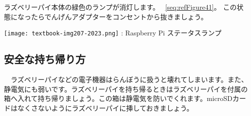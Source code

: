 \documentclass[a4paper,12pt]{jarticle}
\begin{document}
\bigskip
\flushleft
\textcolor[rgb]{0.13333334,0.13333334,0.13333334}{ラズベリーパイ本体の緑色のランプが消灯します。
  ~\ref{seq:refFigure41}。
  この状態になったらでんげんアダプターをコンセントから抜きましょう。}

\bigskip
\centering
\begin{minipage}{8.207cm}
  {\upshape
    \texttt{[image: textbook-img207-2023.png]}
    \newline
    {\theFigure\label{seq:refFigure41}}: Raspberry Pi
    ステータスランプ}
\end{minipage}
\clearpage\subsection{安全な持ち帰り方}
\flushleft
\ \ ラズベリーパイなどの電子機器はらんぼうに扱うと壊れてしまいます。また、静電気にも弱いです。ラズベリーパイを持ち帰るときはラズベリーパイを付属の箱へ入れて持ち帰りましょう。この箱は静電気を防いでくれます。microSDカードはなくさないようにラズベリーパイに挿しておきましょう。

\clearpage
\end{document}
